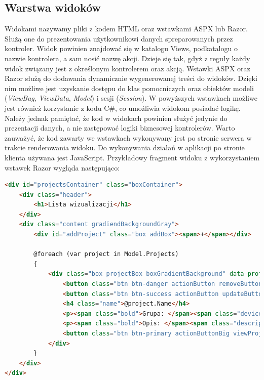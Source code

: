 \subsection{Warstwa widoków}
Widokami nazywamy pliki z kodem HTML oraz wstawkami ASPX lub Razor. Służą one do prezentowania użytkownikowi danych spreparowanych przez kontroler. Widok powinien znajdować się w katalogu Views, podkatalogu o nazwie kontrolera, a sam nosić nazwę akcji. Dzieje się tak, gdyż z reguły każdy widok związany jest z określonym kontrolerem oraz akcją. 
Wstawki ASPX oraz Razor służą do dodawania dynamicznie wygenerowanej treści do widoków. Dzięki nim możliwe jest uzyskanie dostępu do klas pomocniczych oraz obiektów modeli (\textit{ViewBag}, \textit{ViewData}, \textit{Model}) i sesji (\textit{Session}). W powyższych wstawkach możliwe jest również korzystanie z kodu C\#, co umożliwia widokom posiadać logikę. Należy jednak pamiętać, że kod w widokach powinien służyć jedynie do prezentacji danych, a nie zastępować logiki biznesowej kontrolerów. Warto zauważyć, że kod zawarty we wstawkach wykonywany jest po stronie serwera w trakcie renderowania widoku. Do wykonywania działań w aplikacji po stronie klienta używana jest JavaScript. Przykładowy fragment widoku z wykorzystaniem wstawek Razor wygląda następująco:

\begin{lstlisting}[language=HTML]
<div id="projectsContainer" class="boxContainer">
    <div class="header">
        <h1>Lista wizualizacji</h1>
    </div>
    <div class="content gradiendBackgroundGray">
        <div id="addProject" class="box addBox"><span>+</span></div>

        @foreach (var project in Model.Projects)
        {
            <div class="box projectBox boxGradientBackground" data-projectname="@project.Name" data-projectid="@project.Id">
                <button class="btn btn-danger actionButton removeButton"><span class="glyphicon glyphicon-remove"></span></button>
                <button class="btn btn-success actionButton updateButton"><span class="glyphicon glyphicon-pencil"></span></button>
                <h4 class="name">@project.Name</h4>
                <p><span class="bold">Grupa: </span><span class="deviceSchemeName">@project.DeviceScheme.Name</span></p>
                <p><span class="bold">Opis: </span><span class="description">@project.Description</span></p>
                <button class="btn btn-primary actionButtonBig viewProjectButton"><span class=" glyphicon glyphicon-search"></span></button>
            </div>
        }
    </div>
</div>
\end{lstlisting}

